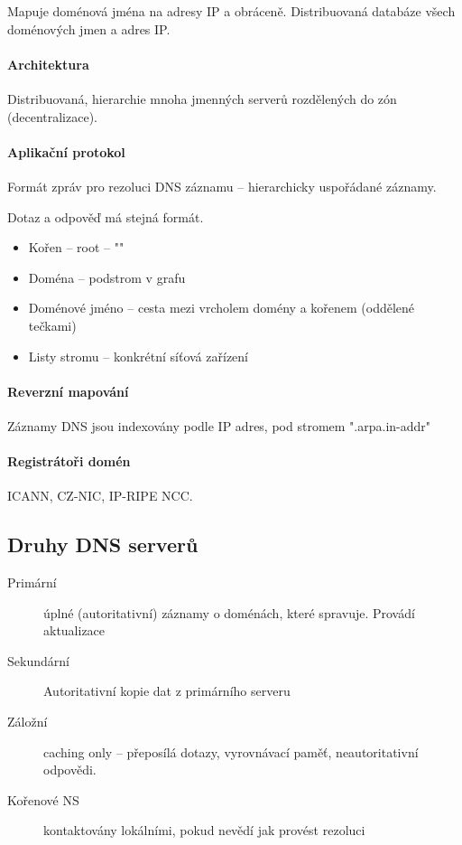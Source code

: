 \documentclass[a4wide]{report}
\begin{document}
Mapuje doménová jména na adresy IP a obráceně. Distribuovaná databáze všech doménových jmen a adres IP.

\paragraph{Architektura}
Distribuovaná, hierarchie mnoha jmenných serverů rozdělených do zón (decentralizace).

\paragraph{Aplikační protokol}
Formát zpráv pro rezoluci DNS záznamu -- hierarchicky uspořádané záznamy.

Dotaz a odpověď má stejná formát.

\begin{itemize}
	\item Kořen -- root -- ""
	\item Doména -- podstrom v grafu
	\item Doménové jméno -- cesta mezi vrcholem domény a kořenem (oddělené tečkami)
	\item Listy stromu -- konkrétní síťová zařízení
\end{itemize}

\paragraph{Reverzní mapování}
Záznamy DNS jsou indexovány podle IP adres, pod stromem ".arpa.in-addr"

\paragraph{Registrátoři domén} ICANN, CZ-NIC, IP-RIPE NCC.

\subsection{Druhy DNS serverů}
\begin{description}
	\item[Primární] úplné (autoritativní) záznamy o doménách, které spravuje. Provádí aktualizace
	\item[Sekundární] Autoritativní kopie dat z primárního serveru
	\item[Záložní] caching only -- přeposílá dotazy, vyrovnávací paměť, neautoritativní odpovědi.
	\item[Kořenové NS] kontaktovány lokálními, pokud nevědí jak provést rezoluci
\end{description}
\end{document}
